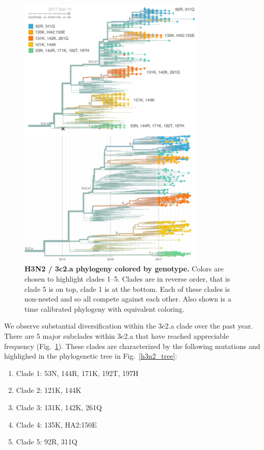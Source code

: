 \documentclass[11pt,oneside,letterpaper]{article}
\newcommand{\FIG}[1]{Fig.~\ref{#1}}
\begin{document}
\clearpage
\begin{figure}[H]
  \centering
  \includegraphics[width=0.8\textwidth]{../figures/sep-2017/h3n2_tree_with_timetree.png}
  \caption{\textbf{H3N2 / 3c2.a phylogeny colored by genotype.} Colors are chosen to highlight clades 1--5. Clades are in reverse order, that is clade 5 is on top, clade 1 is at the bottom. Each of these clades is non-nested and so all compete against each other. Also shown is a time calibrated phylogeny with equivalent coloring.
  }
  \label{h3n2_tree_with_timetree}
\end{figure}


We observe substantial diversification within the 3c2.a clade over the
past year. There are 5 major subclades within 3c2.a that have reached
appreciable frequency (\FIG{h3n2_tree_with_timetree}). These clades are characterized by the following
mutations and highlighed in the phylogenetic tree in \FIG{h3n2_tree}:

\begin{enumerate}
\item  Clade 1: 53N, 144R, 171K, 192T, 197H
\item  Clade 2: 121K, 144K
\item  Clade 3: 131K, 142K, 261Q
\item  Clade 4: 135K, HA2:150E
\item  Clade 5: 92R, 311Q
\end{enumerate}
\end{document}
